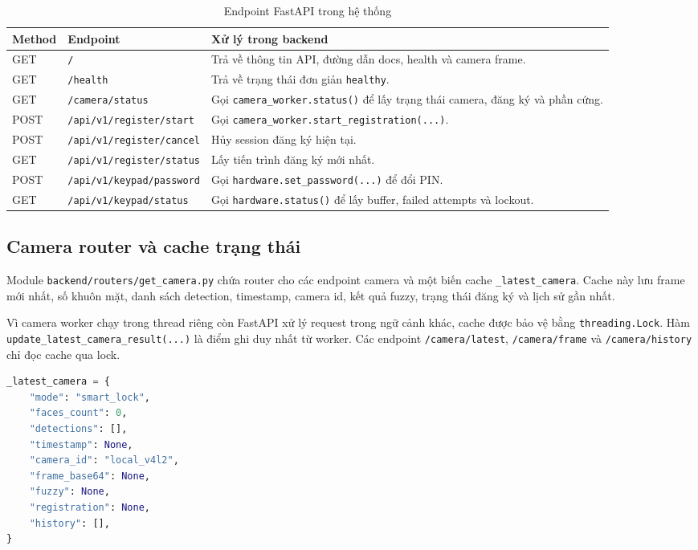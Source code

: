 \begin{table}[H]
\centering
\caption{Endpoint FastAPI trong hệ thống}
\label{tab:main_api_endpoints}
\begin{tabularx}{\textwidth}{|l|l|X|}
\hline
\textbf{Method} & \textbf{Endpoint} & \textbf{Xử lý trong backend} \\
\hline
GET & \texttt{/} & Trả về thông tin API, đường dẫn docs, health và camera frame. \\
\hline
GET & \texttt{/health} & Trả về trạng thái đơn giản \texttt{healthy}. \\
\hline
GET & \texttt{/camera/status} & Gọi \texttt{camera\_worker.status()} để lấy trạng thái camera, đăng ký và phần cứng. \\
\hline
POST & \texttt{/api/v1/register/start} & Gọi \texttt{camera\_worker.start\_registration(...)}. \\
\hline
POST & \texttt{/api/v1/register/cancel} & Hủy session đăng ký hiện tại. \\
\hline
GET & \texttt{/api/v1/register/status} & Lấy tiến trình đăng ký mới nhất. \\
\hline
POST & \texttt{/api/v1/keypad/password} & Gọi \texttt{hardware.set\_password(...)} để đổi PIN. \\
\hline
GET & \texttt{/api/v1/keypad/status} & Gọi \texttt{hardware.status()} để lấy buffer, failed attempts và lockout. \\
\hline
\end{tabularx}
\end{table}

\subsection{Camera router và cache trạng thái}

Module \texttt{backend/routers/get\_camera.py} chứa router cho các endpoint camera và một biến cache \texttt{\_latest\_camera}. Cache này lưu frame mới nhất, số khuôn mặt, danh sách detection, timestamp, camera id, kết quả fuzzy, trạng thái đăng ký và lịch sử gần nhất.

Vì camera worker chạy trong thread riêng còn FastAPI xử lý request trong ngữ cảnh khác, cache được bảo vệ bằng \texttt{threading.Lock}. Hàm \texttt{update\_latest\_camera\_result(...)} là điểm ghi duy nhất từ worker. Các endpoint \texttt{/camera/latest}, \texttt{/camera/frame} và \texttt{/camera/history} chỉ đọc cache qua lock.

\begin{lstlisting}[language=Python, caption={Cấu trúc cache camera mới nhất}]
_latest_camera = {
    "mode": "smart_lock",
    "faces_count": 0,
    "detections": [],
    "timestamp": None,
    "camera_id": "local_v4l2",
    "frame_base64": None,
    "fuzzy": None,
    "registration": None,
    "history": [],
}
\end{lstlisting}

